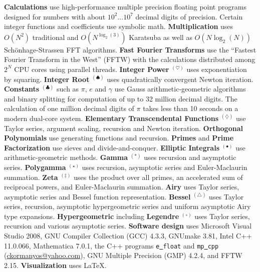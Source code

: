 \textbf{Calculations} use high-performance multiple precision floating
point programs designed for numbers with about $10^2...10^7$ decimal digits of precision.
Certain integer functions and coefficients use symbolic math.
\textbf{Multiplication} uses $O \left ( N^2 \right )$ traditional
and $O \left ( N^{\log_2 \left ( 3 \right ) } \right )$ Karatsuba
as well as $O \left ( N\log_2 \left ( N \right ) \right )$ Sch\"onhage-Strassen FFT algorithms.
\textbf{Fast Fourier Transforms} use the ``Fastest Fourier Transform in the West'' (FFTW)
with the calculations distributed among $2^N$ CPU cores using parallel threads.
\textbf{Integer Power} {\large{$^{\left ( \heartsuit \right )}$}} uses exponentiation by squaring.
\textbf{Integer Root} {\large{$^{\left ( \spadesuit \right )}$}} uses quadratically
convergent Newton iteration.
\textbf{Constants} {\large{$^{\left ( \clubsuit \right )}$}} such as $\pi$, $e$ and $\gamma$
use Gauss arithmetic-geometric algorithms and binary splitting for computation of up to
32 million decimal digits.
The calculation of one million decimal digits of $\pi$ takes less than 10 seconds on
a modern dual-core system.
\textbf{Elementary Transcendental Functions} {\large{$^{\left ( \diamondsuit \right )}$}} use
Taylor series, argument scaling, recursion and Newton iteration.
\textbf{Orthogonal Polynomials} use generating functions and recursion.
\textbf{Primes} and \textbf{Prime Factorization} use sieves and divide-and-conquer.
\textbf{Elliptic Integrals} {\large{$^{\left ( \bullet \right )}$}} use arithmetic-geometric methods.
\textbf{Gamma} {\large{$^{\left ( \ast \right )}$}} uses recursion and asymptotic series.
\textbf{Polygamma} {\large{$^{\left ( \star \right )}$}} uses recursion, asymptotic series
and Euler-Maclaurin summation.
\textbf{Zeta} {\large{$^{\left ( \ddag \right )}$}} uses the product over all primes, an
accelerated sum of reciprocal powers, and Euler-Maclaurin summation.
\textbf{Airy} uses Taylor series, asymptotic series and Bessel function representation.
\textbf{Bessel} {\large{$^{\left ( \triangle \right )}$}} uses Taylor series, recursion,
asymptotic hyper\-geometric series and uniform asymptotic Airy type expansions.
\textbf{Hypergeometric} including \textbf{Legendre} {\large{$^{\left ( \circ \right )}$}}
uses Taylor series, recursion and various asymptotic series.
\textbf{Software design} uses Microsoft{\footnotesize {\textregistered}}
Visual Studio{\footnotesize {\textregistered}} 2008,
GNU Compiler Collection (GCC) 4.3.3, GNUmake 3.81,
Intel{\footnotesize {\textregistered}} C++ 11.0.066,
Mathematica{\footnotesize {\textregistered}} 7.0.1, the C++ programs
{\tt e\underline\ float} and {\tt mp\underline\ cpp} (\url{ckormanyos@yahoo.com}),
GNU Multiple Precision (GMP) 4.2.4, and FFTW 2.15. 
\textbf{Visualization} uses \LaTeX\/.
